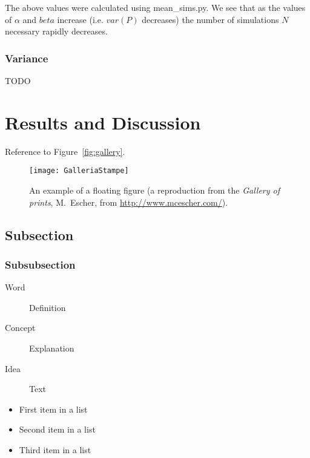 \documentclass[
10pt, %
a4paper, %
oneside, %
headinclude,footinclude, %
BCOR5mm, %
]{scrartcl}
\begin{document}
The above values were calculated using mean\_sims.py. We see that as the values of $\alpha$ and $beta$ increase (i.e. $var(P)$ decreases) the number of simulations $N$ necessary rapidly decreases.

\subsubsection{Variance}
TODO


\section{Results and Discussion}

Reference to Figure~\vref{fig:gallery}. %

\begin{figure}[tb]
\centering 
\texttt{[image: GalleriaStampe]} 
\caption[An example of a floating figure]{An example of a floating figure (a reproduction from the \emph{Gallery of prints}, M.~Escher, from \url{http://www.mcescher.com/}).} %
\label{fig:gallery} 
\end{figure}

\lipsum[10] %


\subsection{Subsection}

\lipsum[11] %

\subsubsection{Subsubsection}

\lipsum[12] %

\begin{description}
\item[Word] Definition
\item[Concept] Explanation
\item[Idea] Text
\end{description}

\lipsum[12] %

\begin{itemize}[noitemsep] %
\item First item in a list
\item Second item in a list
\item Third item in a list
\end{itemize}
\end{document}
